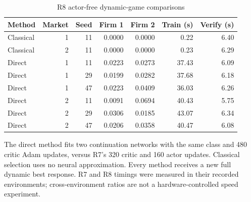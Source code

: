 \begin{table}[htbp]\centering
\caption{R8 actor-free dynamic-game comparisons}
\begin{small}\begin{tabular}{lrrrrrr}
\toprule
Method & Market & Seed & Firm 1 & Firm 2 & Train (s) & Verify (s) \\
\midrule
Classical & 1 & 11 & 0.0000 & 0.0000 & 0.22 & 6.40 \\
Classical & 2 & 11 & 0.0000 & 0.0000 & 0.23 & 6.29 \\
Direct & 1 & 11 & 0.0223 & 0.0273 & 37.43 & 6.09 \\
Direct & 1 & 29 & 0.0199 & 0.0282 & 37.68 & 6.18 \\
Direct & 1 & 47 & 0.0223 & 0.0409 & 36.03 & 6.26 \\
Direct & 2 & 11 & 0.0091 & 0.0694 & 40.43 & 5.75 \\
Direct & 2 & 29 & 0.0306 & 0.0185 & 43.07 & 6.34 \\
Direct & 2 & 47 & 0.0206 & 0.0358 & 40.47 & 6.08 \\
\bottomrule\end{tabular}\end{small}
\par\smallskip\begin{minipage}{.96\linewidth}\footnotesize The direct method fits two continuation networks with the same class and 480 critic Adam updates, versus R7's 320 critic and 160 actor updates. Classical selection uses no neural approximation. Every method receives a new full dynamic best response. R7 and R8 timings were measured in their recorded environments; cross-environment ratios are not a hardware-controlled speed experiment.\end{minipage}
\end{table}
